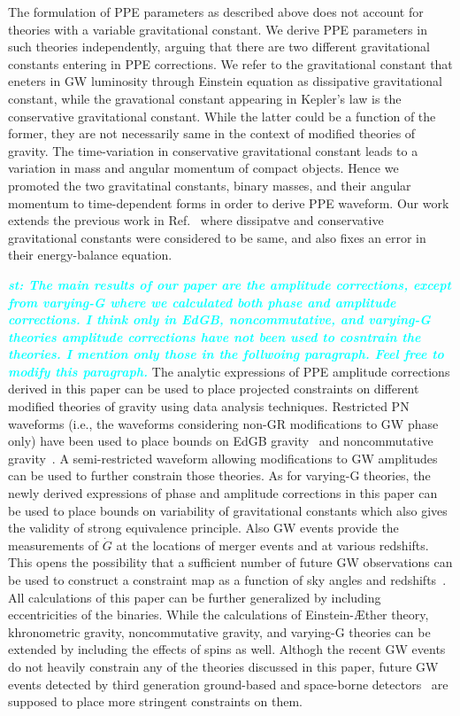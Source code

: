 \documentclass[prd,twocolumn,nofootinbib]{revtex4-1}
\newcommand{\st}[1]{\textcolor{cyan}{\it{\textbf{st: #1}}} }
\begin{document}
The formulation of PPE parameters as described above does not account for theories with a variable gravitational constant. We derive PPE parameters in such theories independently, arguing that there are two different gravitational constants entering in PPE corrections. We refer to the gravitational constant that eneters in GW luminosity through Einstein equation as dissipative gravitational constant, while the gravational constant appearing in Kepler's law is the conservative gravitational constant. While the latter could be a function of the former, they are not necessarily same in the context of modified theories of gravity. The time-variation in conservative gravitational constant leads to a variation in mass and angular momentum of compact objects. Hence we promoted the two gravitatinal constants, binary masses, and their angular momentum to time-dependent forms in order to derive PPE waveform. Our work extends the previous work in Ref.~\cite{Yunes:2009bv} where dissipatve and conservative gravitational constants were considered to be same, and also fixes an error in their energy-balance equation.

\st{The main results of our paper are the amplitude corrections, except from varying-G where we calculated both phase and amplitude corrections. I think only in EdGB, noncommutative, and varying-G theories amplitude corrections have not been used to cosntrain the theories. I mention only those in the follwoing paragraph. Feel free to modify this paragraph.}
The analytic expressions of PPE amplitude corrections derived in this paper can be used to place projected constraints on different modified theories of gravity using data analysis techniques. Restricted PN waveforms (i.e., the waveforms considering non-GR modifications to GW phase only) have been used to place bounds on EdGB gravity~\cite{Yunes:2016jcc} and noncommutative gravity~\cite{Kobakhidze:2016cqh}. A semi-restricted waveform allowing modifications to GW amplitudes can be used to further constrain those theories. As for varying-G theories, the newly derived expressions of phase and amplitude corrections in this paper can be used to place bounds on variability of gravitational constants which also gives the validity of strong equivalence principle. Also GW events provide the measurements of $\dot{G}$ at the locations of merger events and at various redshifts. This opens the possibility that a sufficient number of future GW observations can be used to construct a constraint map as a function of sky angles and redshifts~\cite{Yunes:2009bv}. All calculations of this paper can be further generalized by including eccentricities of the binaries. While the calculations of Einstein-\AE ther theory, khronometric gravity, noncommutative gravity, and varying-G theories can be extended by including the effects of spins as well. Althogh the recent GW events~\cite{Abbott:2016blz,Abbott:2016nmj,Abbott:2017vtc,Abbott:2017gyy,Abbott:2017oio,TheLIGOScientific:2017qsa} do not heavily constrain any of the theories discussed in this paper, future GW events detected by third generation ground-based and space-borne detectors~\cite{Hild:2010id,Seoane:2013qna,Yagi:2013du} are supposed to place more stringent constraints on them.
\end{document}
